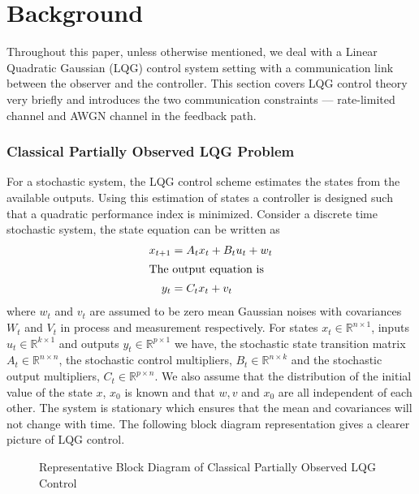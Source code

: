 \documentclass[12pt]{caltech_thesis_finalreport}
\begin{document}
\chapter{Background}
Throughout this paper, unless otherwise mentioned, we deal with a Linear Quadratic Gaussian (LQG) control system setting with a communication link between the observer and the controller. This section covers LQG control theory very briefly and introduces the two communication constraints --- rate-limited channel and AWGN channel in the feedback path.

	\subsection{Classical Partially Observed LQG Problem}
	For a stochastic system, the LQG control scheme estimates the states from the available outputs. Using this estimation of states a controller is designed such that a quadratic performance index is minimized. Consider a discrete time stochastic system, the state equation can be written as
	\begin{align}
	\label{systemeq}
	x_{t+1} &= A_{t}x_{t}+ B_{t}u_{t} + w_{t}\\
	\intertext{The output equation is}
	y_{t}&=C_{t}x_{t}+v_{t}
	\end{align}
	where $w_{t}$ and $v_{t}$ are assumed to be zero mean Gaussian noises with covariances $W_{t}$ and $V_{t}$ in process and measurement respectively. For states $x_{t} \in \mathbb{R}^{n \times 1}$, inputs $u_{t} \in \mathbb{R}^{k \times 1}$ and outputs $y_{t} \in \mathbb{R}^{p \times 1}$ we have, the stochastic state transition matrix $A_{t} \in \mathbb{R}^{n \times n}$, the stochastic control multipliers, $B_{t} \in \mathbb{R}^{n \times k}$ and the stochastic output multipliers, $C_{t} \in \mathbb{R}^{p \times n}$. We also assume that the distribution of the initial value of the state $x$, $x_{0}$ is known and that $w,v$ and $x_{0}$ are all independent of each other. The system is stationary which ensures that the mean and covariances will not change with time. The following block diagram representation gives a clearer picture of LQG control.
	\begin{figure}[H]

			  \centering
%			  
			  \tiny{
			  \resizebox{10cm}{!}{}}
%			
			  \caption{Representative Block Diagram of Classical Partially Observed LQG Control}
			 \label{lqg}
		\end{figure}	
	
\end{document}
